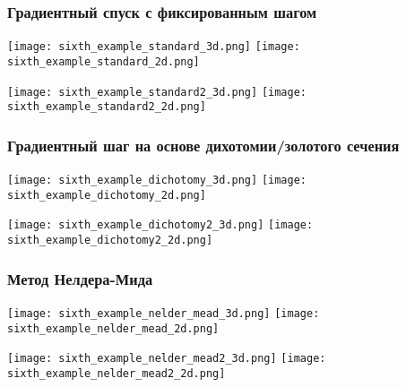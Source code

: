 \documentclass{article}
\begin{document}
\subsubsection*{Градиентный спуск с фиксированным шагом}
\begin{center}
    \texttt{[image: sixth\_example\_standard\_3d.png]}
    \texttt{[image: sixth\_example\_standard\_2d.png]}
    \label{fig:enter-label}
\end{center}
\begin{center}
    \texttt{[image: sixth\_example\_standard2\_3d.png]}
    \texttt{[image: sixth\_example\_standard2\_2d.png]}
    \label{fig:enter-label}
\end{center}
\subsubsection*{Градиентный шаг на основе дихотомии/золотого сечения}
\begin{center}
    \texttt{[image: sixth\_example\_dichotomy\_3d.png]}
    \texttt{[image: sixth\_example\_dichotomy\_2d.png]}
    \label{fig:enter-label}
\end{center}
\begin{center}
    \texttt{[image: sixth\_example\_dichotomy2\_3d.png]}
    \texttt{[image: sixth\_example\_dichotomy2\_2d.png]}
    \label{fig:enter-label}
\end{center}
\subsubsection*{Метод Нелдера-Мида}
\begin{center}
    \texttt{[image: sixth\_example\_nelder\_mead\_3d.png]}
    \texttt{[image: sixth\_example\_nelder\_mead\_2d.png]}
    \label{fig:enter-label}
\end{center}
\begin{center}
    \texttt{[image: sixth\_example\_nelder\_mead2\_3d.png]}
    \texttt{[image: sixth\_example\_nelder\_mead2\_2d.png]}
    \label{fig:enter-label}
\end{center}
\end{document}
